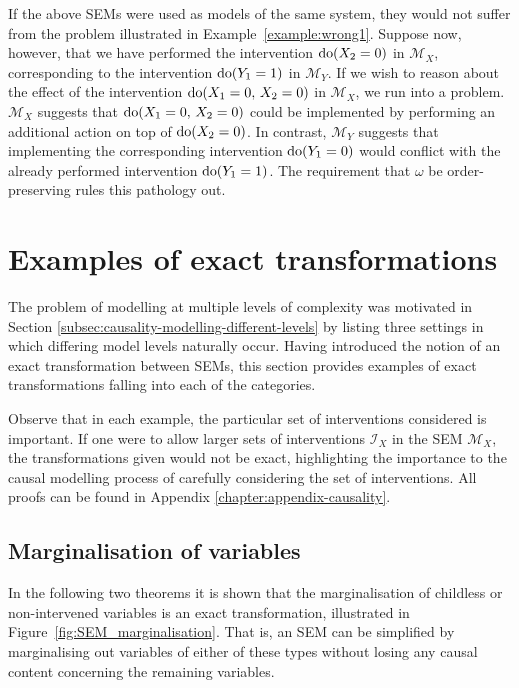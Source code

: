 If the above SEMs were used as models of the same system, they would not suffer from the problem illustrated in Example~\ref{example:wrong1}.
Suppose now, however, that we have performed the intervention $\operatorname{do}(X_2=0)$ in $\mathcal{M}_X$, corresponding to the intervention $\operatorname{do}(Y_1=1)$ in $\mathcal{M}_Y$.
If we wish to reason about the effect of the intervention $\operatorname{do}(X_1=0,\, X_2=0)$ in $\mathcal{M}_X$, we run into a problem.
$\mathcal{M}_X$ suggests that $\operatorname{do}(X_1=0,\, X_2=0)$ could be implemented by performing an additional action on top of $\operatorname{do}(X_2=0)$.
In contrast, $\mathcal{M}_Y$ suggests that implementing the corresponding intervention $\operatorname{do}(Y_1=0)$ would conflict with the already performed intervention $\operatorname{do}(Y_1=1)$.
The requirement that $\omega$ be order-preserving rules this pathology out. 

\section{Examples of exact transformations}\label{sec:causality-causal-examples-of-transformations}

The problem of modelling at multiple levels of complexity was motivated in Section \ref{subsec:causality-modelling-different-levels} by listing three settings in which differing model levels naturally occur.
Having introduced the notion of an exact transformation between SEMs, this section provides examples of exact transformations falling into each of the categories.

Observe that in each example, the particular set of interventions considered is important. If one were to allow larger sets of interventions $\mathcal{I}_X$ in the SEM $\mathcal{M}_X$, the transformations given would not be exact, highlighting the importance to the causal modelling process of carefully considering the set of interventions. All proofs can be found in Appendix \ref{chapter:appendix-causality}.






\subsection{Marginalisation of variables}\label{sec:basic_trafos}

In the following two theorems it is shown that the marginalisation of childless or non-intervened variables is an exact transformation, illustrated in Figure~\ref{fig:SEM_marginalisation}.
That is, an SEM can be simplified by marginalising out variables of either of these types without losing any causal content concerning the remaining variables.

